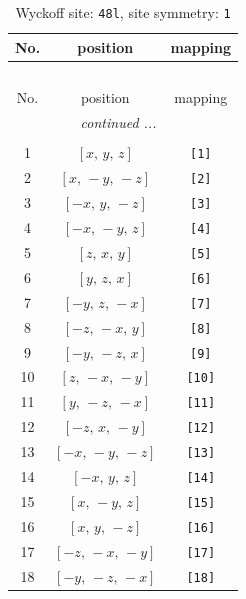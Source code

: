 \documentclass[fleqn,8pt]{jsarticle}
\begin{document}
\begin{longtable}{ccc}
\caption{Wyckoff site: {\tt 48l}, site symmetry: {\tt 1}}
 \\
 \hline \hline
No. & position & mapping \\ \hline \endfirsthead

\multicolumn{2}{l}{\tablename\ \thetable{}} \\
 \hline \hline
No. & position & mapping \\ \hline \endhead

 \hline \hline
\multicolumn{2}{r}{\footnotesize\it continued ...} \\ \endfoot

 \hline \hline
\multicolumn{2}{r}{} \\ \endlastfoot

1 & $\left[ x,\, y,\, z \right]$ & {\tt [1]} \\ \hline
2 & $\left[ x,\, - y,\, - z \right]$ & {\tt [2]} \\ \hline
3 & $\left[ - x,\, y,\, - z \right]$ & {\tt [3]} \\ \hline
4 & $\left[ - x,\, - y,\, z \right]$ & {\tt [4]} \\ \hline
5 & $\left[ z,\, x,\, y \right]$ & {\tt [5]} \\ \hline
6 & $\left[ y,\, z,\, x \right]$ & {\tt [6]} \\ \hline
7 & $\left[ - y,\, z,\, - x \right]$ & {\tt [7]} \\ \hline
8 & $\left[ - z,\, - x,\, y \right]$ & {\tt [8]} \\ \hline
9 & $\left[ - y,\, - z,\, x \right]$ & {\tt [9]} \\ \hline
10 & $\left[ z,\, - x,\, - y \right]$ & {\tt [10]} \\ \hline
11 & $\left[ y,\, - z,\, - x \right]$ & {\tt [11]} \\ \hline
12 & $\left[ - z,\, x,\, - y \right]$ & {\tt [12]} \\ \hline
13 & $\left[ - x,\, - y,\, - z \right]$ & {\tt [13]} \\ \hline
14 & $\left[ - x,\, y,\, z \right]$ & {\tt [14]} \\ \hline
15 & $\left[ x,\, - y,\, z \right]$ & {\tt [15]} \\ \hline
16 & $\left[ x,\, y,\, - z \right]$ & {\tt [16]} \\ \hline
17 & $\left[ - z,\, - x,\, - y \right]$ & {\tt [17]} \\ \hline
18 & $\left[ - y,\, - z,\, - x \right]$ & {\tt [18]} \\ \hline

\end{longtable}
\end{document}
